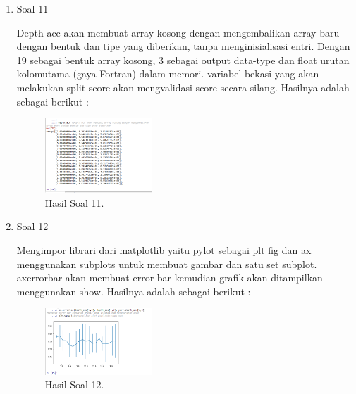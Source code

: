 \begin{enumerate}
	\item Soal 11
	\hfill\break
	
	Depth acc akan membuat array kosong dengan mengembalikan array baru dengan bentuk dan tipe yang diberikan, tanpa menginisialisasi entri. Dengan 19 sebagai bentuk array kosong, 3 sebagai output data-type dan float urutan kolomutama (gaya Fortran) dalam memori. variabel bekasi yang akan melakukan split score akan mengvalidasi score secara silang. Hasilnya adalah sebagai berikut :
	\begin{figure}[H]
	\centering
		\includegraphics[width=4cm]{figures/1174096/tugas2/2/hasil11.PNG}
		\caption{Hasil Soal 11.}
	\end{figure}

	\item Soal 12
	\hfill\break
	
	Mengimpor librari dari matplotlib yaitu pylot sebagai plt fig dan ax menggunakan subplots untuk membuat gambar dan satu set subplot. axerrorbar akan membuat error bar kemudian grafik akan ditampilkan menggunakan show. Hasilnya adalah sebagai berikut :
	\begin{figure}[H]
	\centering
		\includegraphics[width=4cm]{figures/1174096/tugas2/2/hasil12.PNG}
		\caption{Hasil Soal 12.}
	\end{figure}
\end{enumerate}

